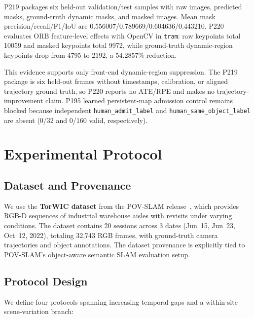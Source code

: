 \documentclass[journal]{IEEEtran}
\begin{document}
P219 packages six held-out validation/test samples with raw images, predicted masks, ground-truth dynamic masks, and masked images. Mean mask precision/recall/F1/IoU are 0.556007/0.789669/0.604636/0.443210. P220 evaluates ORB feature-level effects with OpenCV in \texttt{tram}: raw keypoints total 10059 and masked keypoints total 9972, while ground-truth dynamic-region keypoints drop from 4795 to 2192, a 54.2857\% reduction.

This evidence supports only front-end dynamic-region suppression. The P219 package is six held-out frames without timestamps, calibration, or aligned trajectory ground truth, so P220 reports no ATE/RPE and makes no trajectory-improvement claim. P195 learned persistent-map admission control remains blocked because independent \texttt{human\_admit\_label} and \texttt{human\_same\_object\_label} are absent (0/32 and 0/160 valid, respectively).

\section{Experimental Protocol}
\label{sec:protocol}

\subsection{Dataset and Provenance}
\label{sec:protocol_dataset}

We use the \textbf{TorWIC dataset} from the POV-SLAM release~\cite{barath2023povslam}, which provides RGB-D sequences of industrial warehouse aisles with revisits under varying conditions. The dataset contains 20 sessions across 3 dates (Jun~15, Jun~23, Oct~12, 2022), totaling 32,743 RGB frames, with ground-truth camera trajectories and object annotations. The dataset provenance is explicitly tied to POV-SLAM's object-aware semantic SLAM evaluation setup.

\subsection{Protocol Design}
\label{sec:protocol_design}

We define four protocols spanning increasing temporal gaps and a within-site scene-variation branch:
\end{document}
